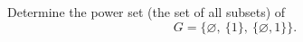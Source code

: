 Determine the power set (the set of all subsets) of
\[
G=\{\varnothing,\ \{1\},\ \{\varnothing,1\}\}.
\]
